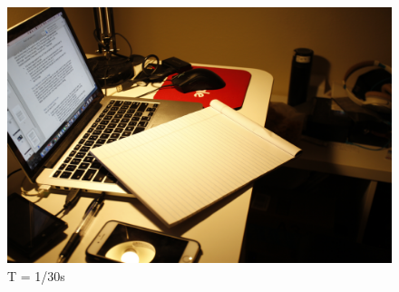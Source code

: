 \documentclass[10pt,twocolumn,letterpaper]{article}
\begin{document}
\begin{figure}[bhp]
\includegraphics[width=\columnwidth]{images/_MG_6277}
\caption{T = 1/30s}

\label{fig:samplepicture}
\end{figure}
\end{document}
